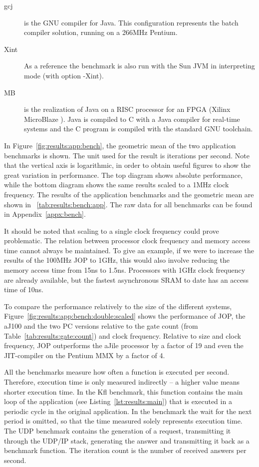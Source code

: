 \begin{description}
    \item[gcj]
is the GNU compiler for Java. This configuration represents the
batch compiler solution, running on a 266MHz Pentium.

    \item[Xint]
As a reference the benchmark is also run with the Sun JVM in
interpreting mode (with option -Xint).

    \item[MB]
is the realization of Java on a RISC processor for an FPGA (Xilinx
MicroBlaze \cite{microblaze}). Java is compiled to C with a Java
compiler for real-time systems \cite{Java2C} and the C program is
compiled with the standard GNU toolchain.

\end{description}
%
In Figure~\ref{fig:results:app:bench}, the geometric mean of the two
application benchmarks is shown. The unit used for the result is
iterations per second. Note that the vertical axis is logarithmic,
in order to obtain useful figures to show the great variation in
performance. The top diagram shows absolute performance, while the
bottom diagram shows the same results scaled to a 1MHz clock
frequency. The results of the application benchmarks and the
geometric mean are shown in \tablename~\ref{tab:results:bench:app}.
The raw data for all benchmarks can be found in
Appendix~\ref{appx:bench}.

It should be noted that scaling to a single clock frequency could
prove problematic. The relation between processor clock frequency
and memory access time cannot always be maintained. To give an
example, if we were to increase the results of the 100MHz JOP to
1GHz, this would also involve reducing the memory access time from
15ns to 1.5ns. Processors with 1GHz clock frequency are already
available, but the fastest asynchronous SRAM to date has an access
time of 10ns.

To compare the performance relatively to the size of the different
systems, Figure~\ref{fig:results:app:bench:double:scaled} shows the
performance of JOP, the aJ100 and the two PC versions relative to
the gate count (from Table~\ref{tab:results:gate:count}) and clock
frequency. Relative to size and clock frequency, JOP outperforms the
aJile processor by a factor of 19 and even the JIT-compiler on the
Pentium MMX by a factor of 4.


All the benchmarks measure how often a function is executed per
second. Therefore, execution time is only measured indirectly -- a
higher value means shorter execution time. In the Kfl benchmark,
this function contains the main loop of the application (see
Listing~\ref{lst:results:main}) that is executed in a periodic cycle
in the original application. In the benchmark the wait for the next
period is omitted, so that the time measured solely represents
execution time. The UDP benchmark contains the generation of a
request, transmitting it through the UDP/IP stack, generating the
answer and transmitting it back as a benchmark function. The
iteration count is the number of received answers per second.


